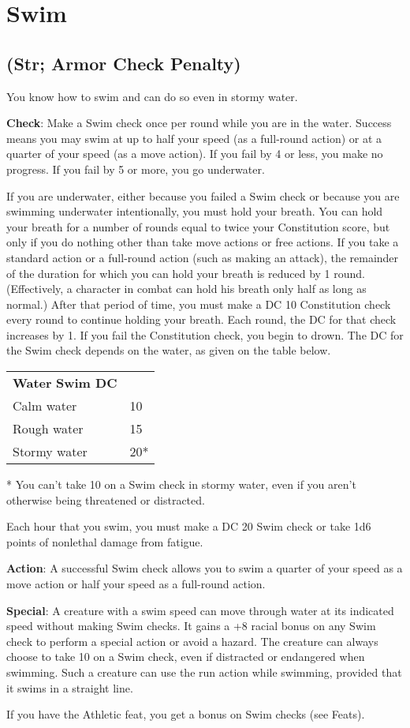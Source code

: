 \section{Swim}

\label{f0}
\subsection{(Str; Armor Check Penalty)}

				
You know how to swim and can do so even in stormy water.
				
\textbf{Check}: Make a Swim check once per round while you are in the water. Success means you may swim at up to half your speed (as a full-round action) or at a quarter of your speed (as a move action). If you fail by 4 or less, you make no progress. If you fail by 5 or more, you go underwater.
				
If you are underwater, either because you failed a Swim check or because you are swimming underwater intentionally, you must hold your breath. You can hold your breath for a number of rounds equal to twice your Constitution score, but only if you do nothing other than take move actions or free actions. If you take a standard action or a full-round action (such as making an attack), the remainder of the duration for which you can hold your breath is reduced by 1 round. (Effectively, a character in combat can hold his breath only half as long as normal.) After that period of time, you must make a DC 10 Constitution check every round to continue holding your breath. Each round, the DC for that check increases by 1. If you fail the Constitution check, you begin to drown. The DC for the Swim check depends on the water, as given on the table below.
\begin{table}
 \sffamily
 \begin{tabularx}{\linewidth}{Xl}
\textbf{Water} \textbf{Swim DC}\\
Calm water & 10\\
Rough water & 15\\
Stormy water & 20*\\
 \end{tabularx}
* You can't take 10 on a Swim check in stormy water, even if you aren't otherwise being threatened or distracted.
\end{table}
				
Each hour that you swim, you must make a DC 20 Swim check or take 1d6 points of nonlethal damage from fatigue.
				
\textbf{Action}: A successful Swim check allows you to swim a quarter of your speed as a move action or half your speed as a full-round action.
				
\textbf{Special}: A creature with a swim speed can move through water at its indicated speed without making Swim checks. It gains a +8 racial bonus on any Swim check to perform a special action or avoid a hazard. The creature can always choose to take 10 on a Swim check, even if distracted or endangered when swimming. Such a creature can use the run action while swimming, provided that it swims in a straight line.
				
If you have the Athletic feat, you get a bonus on Swim checks (see Feats).
